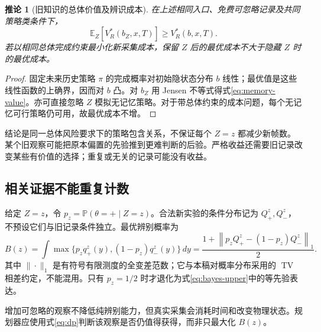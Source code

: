 \documentclass[11pt,a4paper,fontset=fandol]{ctexart}
\newtheorem{corollary}[theorem]{推论}
\theoremstyle{definition}
\theoremstyle{remark}
\numberwithin{equation}{section}
\newcommand{\E}{\mathbb E}
\newcommand{\Pp}{\mathbb P}
\newcommand{\TV}{\operatorname{TV}}
\newcommand{\norm}[1]{\left\lVert#1\right\rVert}
\begin{document}
\begin{corollary}[旧知识的总体价值及辨识成本]
\label{cor:memory}
在上述相同入口、免费可忽略记录及共同策略类条件下，
\begin{equation}
 \E_Z[V_R^*(b_Z,x,T)]\ge V_R^*(b,x,T).
 \label{eq:memory-value}
\end{equation}
若以相同总体完成约束最小化新采集成本，保留 $Z$ 后的最优成本不大于隐藏 $Z$ 时的最优成本。
\end{corollary}
\begin{proof}
固定未来历史策略 $\pi$ 的完成概率对初始隐状态分布 $b$ 线性；最优值是这些线性函数的上确界，因而对 $b$ 凸。对 $b_Z$ 用 Jensen 不等式得式\eqref{eq:memory-value}。亦可直接忽略 $Z$ 模拟无记忆策略。对于带总体约束的成本问题，每个无记忆可行策略仍可用，故最优成本不增。
\end{proof}
结论是同一总体风险要求下的策略包含关系，不保证每个 $Z=z$ 都减少新帧数。某个旧观察可能把原本偏置的先验推到更难判断的后验。严格收益还需要旧记录改变某些有价值的选择；重复或无关的记录可能没有收益。

\subsection{相关证据不能重复计数}
给定 $Z=z$，令 $p_z=\Pp(\theta=+\mid Z=z)$。合法新实验的条件分布记为 $Q_+^z,Q_-^z$，不预设它们与旧记录条件独立。最优辨别概率为
\begin{equation}
 B(z)=
 \int\max\{p_zq_+^z(y),(1-p_z)q_-^z(y)\}\,dy
 =\frac{1+\norm{p_zQ_+^z-(1-p_z)Q_-^z}_1}{2}.
 \label{eq:weighted-bayes}
\end{equation}
其中 $\|\cdot\|_1$ 是有符号有限测度的全变差范数；它与本稿对概率分布采用的 $\TV$ 相差约定，不能混用。只有 $p_z=1/2$ 时才退化为式\eqref{eq:bayes-upper}中的等先验表达。

增加可忽略的观察不降低纯辨别能力，但真实采集会消耗时间和改变物理状态。规划器应使用式\eqref{eq:dp}判断该观察是否仍值得获得，而非只最大化 $B(z)$。
\end{document}
